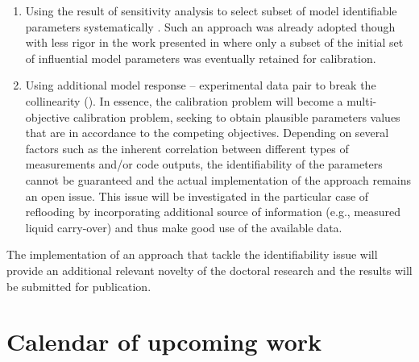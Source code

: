 \documentclass[11pt,titlepage]{article}
\begin{document}
\begin{enumerate}
    \item Using the result of sensitivity analysis to select subset of model 
    identifiable parameters systematically 
    \cite{Sin2010, Brun2001, Brun2002}. 
    Such an approach was already adopted though with less rigor in the 
    work presented in \cite{Wicaksono2016} where only a subset of the 
    initial set of influential model parameters was eventually retained 
    for calibration.
    \item Using additional model response – experimental data pair to break the 
    collinearity (\cite{Reichert2012, Arendt2012}). 
    In essence, the calibration problem will become a 
    multi-objective calibration problem, seeking to obtain plausible parameters 
    values that are in accordance to the competing objectives. 
    Depending on several factors such as the inherent correlation between 
    different types of measurements and/or code outputs, the identifiability 
    of the parameters cannot be guaranteed and the actual implementation of the 
    approach remains an open issue. This issue will be investigated in the 
    particular case of reflooding by incorporating additional source of 
    information (e.g., measured liquid carry-over) and thus make good use of 
    the available data.    
\end{enumerate}

The implementation of an approach that tackle the identifiability issue will 
provide an additional relevant novelty of the doctoral research and the 
results will be submitted for publication. 


\section{Calendar of upcoming work}
\end{document}
